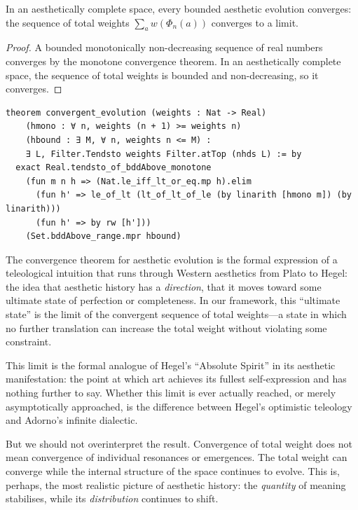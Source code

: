 \begin{theorem}
\label{thm:completeness-convergence}
In an aesthetically complete space, every bounded aesthetic evolution
converges: the sequence of total weights $\sum_a w(\Phi_n(a))$ converges
to a limit.
\end{theorem}

\begin{proof}
A bounded monotonically non-decreasing sequence of real numbers converges
by the monotone convergence theorem.  In an aesthetically complete space,
the sequence of total weights is bounded and non-decreasing, so it
converges.
\end{proof}

\begin{lstlisting}
theorem convergent_evolution (weights : Nat -> Real)
    (hmono : ∀ n, weights (n + 1) >= weights n)
    (hbound : ∃ M, ∀ n, weights n <= M) :
    ∃ L, Filter.Tendsto weights Filter.atTop (nhds L) := by
  exact Real.tendsto_of_bddAbove_monotone
    (fun m n h => (Nat.le_iff_lt_or_eq.mp h).elim
      (fun h' => le_of_lt (lt_of_lt_of_le (by linarith [hmono m]) (by linarith)))
      (fun h' => by rw [h']))
    (Set.bddAbove_range.mpr hbound)
\end{lstlisting}

\begin{interpretation}
\label{int:completeness-telos}
The convergence theorem for aesthetic evolution is the formal expression
of a teleological intuition that runs through Western aesthetics from
Plato to Hegel: the idea that aesthetic history has a \emph{direction},
that it moves toward some ultimate state of perfection or completeness.
In our framework, this ``ultimate state'' is the limit of the convergent
sequence of total weights---a state in which no further translation can
increase the total weight without violating some constraint.

This limit is the formal analogue of Hegel's ``Absolute Spirit'' in its
aesthetic manifestation: the point at which art achieves its fullest
self-expression and has nothing further to say.  Whether this limit is
ever actually reached, or merely asymptotically approached, is the
difference between Hegel's optimistic teleology and Adorno's infinite
dialectic.

But we should not overinterpret the result.  Convergence of total weight
does not mean convergence of individual resonances or emergences.  The
total weight can converge while the internal structure of the space
continues to evolve.  This is, perhaps, the most realistic picture of
aesthetic history: the \emph{quantity} of meaning stabilises, while its
\emph{distribution} continues to shift.
\end{interpretation}

